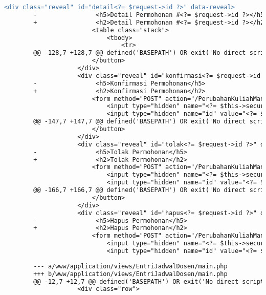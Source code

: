 \begin{itemize}
\begin{lstlisting}[frame=single, label={lst:perbaikan_1.3.1_tag_heading}, language=diff, caption=Perbaikan Kriteria Sukses 1.3.1 - Penggunaan \textit{Heading} Tidak Tepat]
                    <div class="reveal" id="detail<?= $request->id ?>" data-reveal>
        -                <h5>Detail Permohonan #<?= $request->id ?></h5>
        +                <h2>Detail Permohonan #<?= $request->id ?></h2>
                        <table class="stack">
                            <tbody>
                                <tr>
        @@ -128,7 +128,7 @@ defined('BASEPATH') OR exit('No direct script access allowed');
                        </button>
                    </div>
                    <div class="reveal" id="konfirmasi<?= $request->id ?>" data-reveal>
        -                <h5>Konfirmasi Permohonan</h5>
        +                <h2>Konfirmasi Permohonan</h2>
                        <form method="POST" action="/PerubahanKuliahManage/answer">
                            <input type="hidden" name="<?= $this->security->get_csrf_token_name() ?>" value="<?= $this->security->get_csrf_hash() ?>" />
                            <input type="hidden" name="id" value="<?= $request->id ?>"/>
        @@ -147,7 +147,7 @@ defined('BASEPATH') OR exit('No direct script access allowed');
                        </button>
                    </div>        
                    <div class="reveal" id="tolak<?= $request->id ?>" data-reveal>
        -                <h5>Tolak Permohonan</h5>
        +                <h2>Tolak Permohonan</h2>
                        <form method="POST" action="/PerubahanKuliahManage/answer">
                            <input type="hidden" name="<?= $this->security->get_csrf_token_name() ?>" value="<?= $this->security->get_csrf_hash() ?>" />
                            <input type="hidden" name="id" value="<?= $request->id ?>"/>
        @@ -166,7 +166,7 @@ defined('BASEPATH') OR exit('No direct script access allowed');
                        </button>
                    </div>
                    <div class="reveal" id="hapus<?= $request->id ?>" data-reveal>
        -                <h5>Hapus Permohonan</h5>
        +                <h2>Hapus Permohonan</h2>
                        <form method="POST" action="/PerubahanKuliahManage/remove">
                            <input type="hidden" name="<?= $this->security->get_csrf_token_name() ?>" value="<?= $this->security->get_csrf_hash() ?>" />
                            <input type="hidden" name="id" value="<?= $request->id ?>"/>
        
        --- a/www/application/views/EntriJadwalDosen/main.php
        +++ b/www/application/views/EntriJadwalDosen/main.php
        @@ -12,7 +12,7 @@ defined('BASEPATH') OR exit('No direct script access allowed');
                    <div class="row">
            

\end{lstlisting}
\end{itemize}
